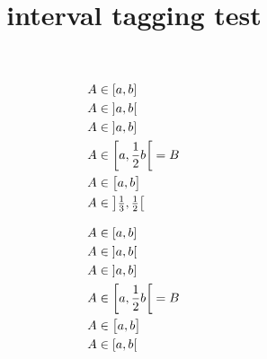 \documentclass{article}
\title{interval tagging test}
\begin{document}
\begin{align*}
& A\in\interval{a}{b}              \\
& A\in\interval[open]{a}{b}        \\
& A\in\interval[open left]{a}{b}   \\
& A\in\interval[open right,
  scaled]{a}{\frac{1}{2}b}=B       \\
& A\in\interval[scaled=\big]{a}{b} \\
& A\in\ointerval[scaled]{%
  \tfrac{1}{3}}{\tfrac{1}{2}}
\end{align*}

\begin{align*}
& A\in\interval{a}{b}              \\
& A\in\interval[open]{a}{b}        \\
& A\in\interval[open left]{a}{b}   \\
& A\in\interval[open right,
  scaled]{a}{\frac{1}{2}b}=B       \\
& A\in\interval[scaled=\big]{a}{b} \\
& A\in\rinterval{a}{b}
\end{align*}
\end{document}
